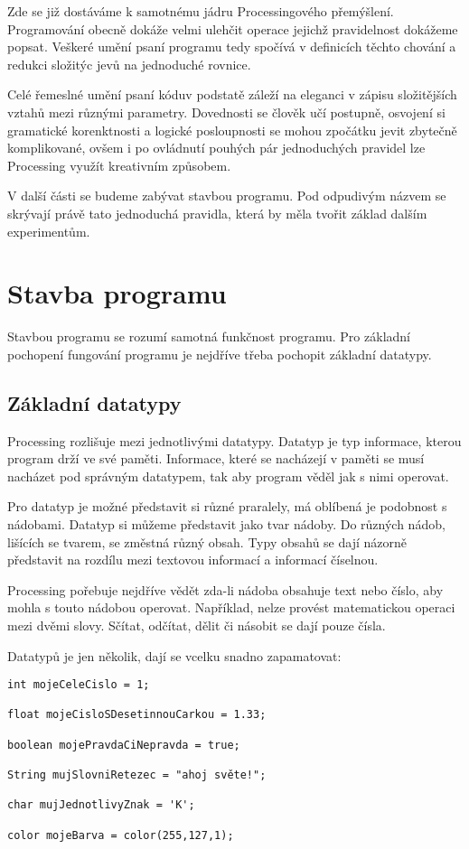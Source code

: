 \documentclass[11pt]{article} %
\begin{document}
Zde se již dostáváme k samotnému jádru Processingového přemýšlení. Programování obecně dokáže velmi ulehčit operace jejichž pravidelnost dokážeme popsat. Veškeré umění psaní programu tedy spočívá v definicích těchto chování a redukci složitýc jevů na jednoduché rovnice.

Celé řemeslné umění psaní kóduv podstatě záleží na eleganci v zápisu složitějších vztahů mezi různými parametry. Dovednosti se člověk učí postupně, osvojení si gramatické korenktnosti a logické posloupnosti se mohou zpočátku jevit zbytečně komplikované, ovšem i po ovládnutí pouhých pár jednoduchých pravidel lze Processing využít kreativním způsobem.

V další části se budeme zabývat stavbou programu. Pod odpudivým názvem se skrývají právě tato jednoduchá pravidla, která by měla tvořit základ dalším experimentům.   

\newpage
\section{Stavba programu}


Stavbou programu se rozumí samotná funkčnost programu. Pro základní pochopení fungování programu je nejdříve třeba pochopit základní datatypy.

\subsection{Základní datatypy}

Processing rozlišuje mezi jednotlivými datatypy. Datatyp je typ informace, kterou program drží ve své paměti. Informace, které se nacházejí v paměti se musí nacházet pod správným datatypem, tak aby program věděl jak s nimi operovat.

Pro datatyp je možné představit si různé praralely, má oblíbená je podobnost s nádobami. Datatyp si můžeme představit jako tvar nádoby. Do různých nádob, lišících se tvarem, se změstná různý obsah. Typy obsahů se dají názorně představit na rozdílu mezi textovou informací a informací číselnou.

Processing pořebuje nejdříve vědět zda-li nádoba obsahuje text nebo číslo, aby mohla s touto nádobou operovat. Například, nelze provést matematickou operaci mezi dvěmi slovy. Sčítat, odčítat, dělit či násobit se dají pouze čísla.

Datatypů je jen několik, dají se vcelku snadno zapamatovat:

\begin{verbatim}
int mojeCeleCislo = 1;

float mojeCisloSDesetinnouCarkou = 1.33;

boolean mojePravdaCiNepravda = true;

String mujSlovniRetezec = "ahoj světe!";

char mujJednotlivyZnak = 'K';

color mojeBarva = color(255,127,1);
\end{verbatim}
\end{document}
